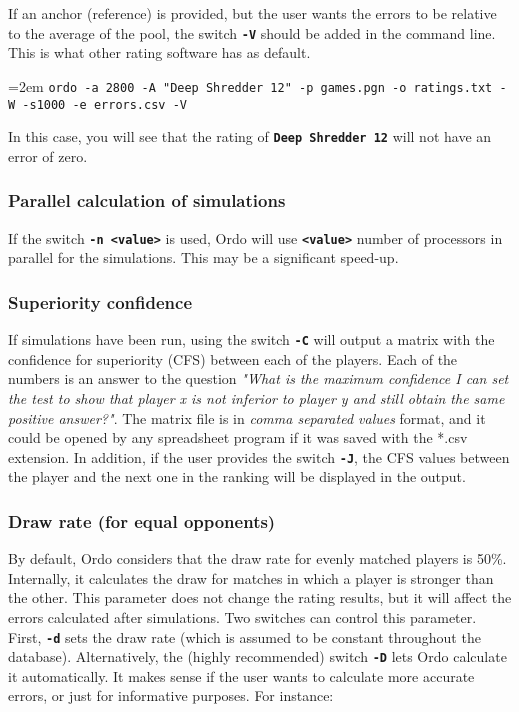 \documentclass[12pt]{article}
\newcommand{\swtch} [1] {\texttt{\textbf{#1}}}
\newcommand{\cmdln}[1]{
	\par
	\begingroup
		\leftskip=2em
		\addtolength{\rightskip}{0em}
		\noindent \small{\texttt{#1}}
		\par
	\endgroup
}
\begin{document}
If an anchor (reference) is provided, but the user wants the errors to be relative to the average of the pool, the switch \swtch{-V} should be added in the command line. This is what other rating software has as default.

\cmdln{ordo -a 2800 -A "Deep Shredder 12" -p games.pgn -o ratings.txt -W -s1000 -e errors.csv -V}

In this case, you will see that the rating of \swtch{Deep Shredder 12} will not have an error of zero.

\subsubsection*{Parallel calculation of simulations}

If the switch \swtch{-n <value>} is used, Ordo will use \swtch{<value>} number of processors in parallel for the simulations.
This may be a significant speed-up.

\subsubsection*{Superiority confidence}

If simulations have been run, using the switch \swtch{-C} will output a matrix with the confidence for superiority (CFS) between each of the players.
Each of the numbers is an answer to the question \textit{"What is the maximum confidence I can set the test to show that player x is not inferior to player y and still obtain the same positive answer?"}.
The matrix file is in \textit{comma separated values} format, and it could be opened by any spreadsheet program if it was saved with the *.csv extension.
In addition, if the user provides the switch \swtch{-J}, the CFS values between the player and the next one in the ranking will be displayed in the output.

\subsubsection*{Draw rate (for equal opponents)}
By default, Ordo considers that the draw rate for evenly matched players is 50\%.
Internally, it calculates the draw for matches in which a player is stronger than the other.
This parameter does not change the rating results, but it will affect the errors calculated after simulations.
Two switches can control this parameter. 
First, \swtch{-d} sets the draw rate (which is assumed to be constant throughout the database). 
Alternatively, the (highly recommended) switch \swtch{-D} lets Ordo calculate it automatically. 
It makes sense if the user wants to calculate more accurate errors, or just for informative purposes.
For instance:
\end{document}
